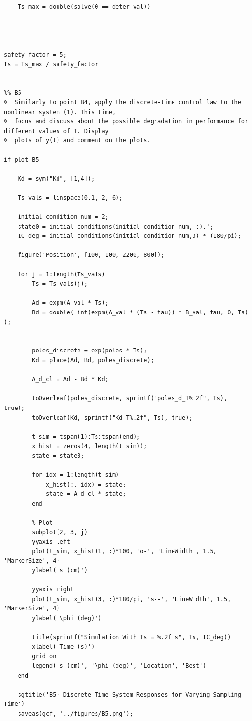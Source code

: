 \documentclass{article}
\begin{document}
\begin{verbatim}
    Ts_max = double(solve(0 == deter_val))




safety_factor = 5;
Ts = Ts_max / safety_factor


%% B5
%  Similarly to point B4, apply the discrete-time control law to the nonlinear system (1). This time,
%  focus and discuss about the possible degradation in performance for different values of T. Display
%  plots of y(t) and comment on the plots.

if plot_B5

    Kd = sym("Kd", [1,4]);
    
    Ts_vals = linspace(0.1, 2, 6);
    
    initial_condition_num = 2;
    state0 = initial_conditions(initial_condition_num, :).'; 
    IC_deg = initial_conditions(initial_condition_num,3) * (180/pi);
    
    figure('Position', [100, 100, 2200, 800]);
    
    for j = 1:length(Ts_vals)
        Ts = Ts_vals(j);  
   
        Ad = expm(A_val * Ts);
        Bd = double( int(expm(A_val * (Ts - tau)) * B_val, tau, 0, Ts) ); 
    

        poles_discrete = exp(poles * Ts);
        Kd = place(Ad, Bd, poles_discrete);
    
        A_d_cl = Ad - Bd * Kd;

        toOverleaf(poles_discrete, sprintf("poles_d_T%.2f", Ts), true);
        toOverleaf(Kd, sprintf("Kd_T%.2f", Ts), true);
    
        t_sim = tspan(1):Ts:tspan(end);
        x_hist = zeros(4, length(t_sim)); 
        state = state0;
    
        for idx = 1:length(t_sim)
            x_hist(:, idx) = state;
            state = A_d_cl * state;
        end
    
        % Plot
        subplot(2, 3, j)
        yyaxis left
        plot(t_sim, x_hist(1, :)*100, 'o-', 'LineWidth', 1.5, 'MarkerSize', 4)
        ylabel('s (cm)')
    
        yyaxis right
        plot(t_sim, x_hist(3, :)*180/pi, 's--', 'LineWidth', 1.5, 'MarkerSize', 4)
        ylabel('\phi (deg)')
    
        title(sprintf("Simulation With Ts = %.2f s", Ts, IC_deg))
        xlabel('Time (s)')
        grid on
        legend('s (cm)', '\phi (deg)', 'Location', 'Best')
    end
    
    sgtitle('B5) Discrete-Time System Responses for Varying Sampling Time')
    saveas(gcf, '../figures/B5.png');




\end{verbatim}
\end{document}
